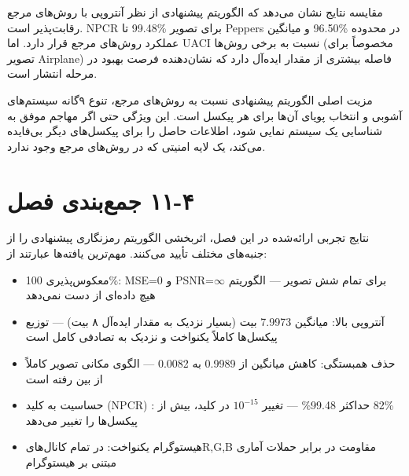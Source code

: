 مقایسه نتایج نشان می‌دهد که الگوریتم پیشنهادی از نظر آنتروپی با روش‌های مرجع رقابت‌پذیر است.    NPCR تا ‎99.48\%‎ برای تصویر Peppers و میانگین ‎96.50\% در محدوده عملکرد روش‌های مرجع قرار دارد. اما UACI نسبت به برخی روش‌ها (مخصوصاً برای تصویر Airplane) فاصله بیشتری از مقدار ایده‌آل دارد که نشان‌دهنده فرصت بهبود در مرحله انتشار است.

مزیت اصلی الگوریتم پیشنهادی نسبت به روش‌های مرجع، تنوع ۹گانه سیستم‌های آشوبی و انتخاب پویای آن‌ها برای هر پیکسل است. این ویژگی حتی اگر مهاجم موفق به شناسایی یک سیستم نمایی شود، اطلاعات حاصل را برای پیکسل‌های دیگر بی‌فایده می‌کند، یک لایه امنیتی که در روش‌های مرجع وجود ندارد.

\section{‏۴‏-‏۱۱‏ جمع‌بندی فصل}

نتایج تجربی ارائه‌شده در این فصل، اثربخشی الگوریتم رمزنگاری پیشنهادی را از جنبه‌های مختلف تأیید می‌کنند. مهم‌ترین یافته‌ها عبارتند از:

\begin{itemize}
    \item معکوس‌پذیری 100\%:  MSE=0 و PSNR=$\infty$ برای تمام شش تصویر --- الگوریتم هیچ داده‌ای از دست نمی‌دهد
\end{itemize}

\begin{itemize}
    \item آنتروپی بالا: میانگین 7.9973 بیت (بسیار نزدیک به مقدار ایده‌آل ۸ بیت) --- توزیع پیکسل‌ها کاملاً یکنواخت و نزدیک به تصادفی کامل است
\end{itemize}

\begin{itemize}
    \item حذف همبستگی: کاهش میانگین از 0.9989 به 0.0082 --- الگوی مکانی تصویر کاملاً از بین رفته است
\end{itemize}

\begin{itemize}
    \item حساسیت به کلید (NPCR) : حداکثر 99.48\% --- تغییر $10^{-15}$ در کلید، بیش از ‎82\%‎ پیکسل‌ها را تغییر می‌دهد
\end{itemize}

\begin{itemize}
    \item هیستوگرام یکنواخت:  در تمام کانال‌هایR,G,B   مقاومت در برابر حملات آماری مبتنی بر هیستوگرام
\end{itemize}

